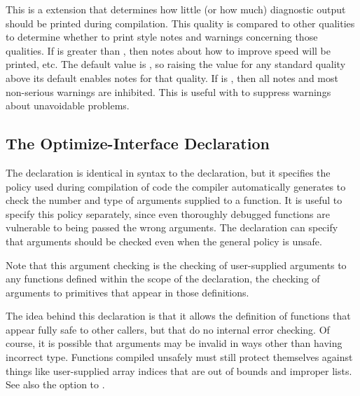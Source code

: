 \begin{Lentry}
\item[\code{extensions:inhibit-warnings}] This is a \cmucl{} extension that determines how
  little (or how much) diagnostic output should be printed during
  compilation.  This quality is compared to other qualities to
  determine whether to print style notes and warnings concerning those
  qualities.  If  is greater than ,
  then notes about how to improve speed will be printed, etc.  The
  default value is , so raising the value for any standard
  quality above its default enables notes for that quality.  If
   is , then all notes and most
  non-serious warnings are inhibited.  This is useful with
   to suppress warnings about unavoidable problems.
\end{Lentry}


\subsection{The Optimize-Interface Declaration}
\label{optimize-interface-declaration}

The  declaration is identical in
syntax to the  declaration, but it specifies the policy
used during compilation of code the compiler automatically generates
to check the number and type of arguments supplied to a function.  It
is useful to specify this policy separately, since even thoroughly
debugged functions are vulnerable to being passed the wrong arguments.
The  declaration can specify that arguments
should be checked even when the general  policy is
unsafe.

Note that this argument checking is the checking of user-supplied
arguments to any functions defined within the scope of the
declaration,  the checking of arguments to \llisp{}
primitives that appear in those definitions.

The idea behind this declaration is that it allows the definition of
functions that appear fully safe to other callers, but that do no
internal error checking.  Of course, it is possible that arguments may
be invalid in ways other than having incorrect type.  Functions
compiled unsafely must still protect themselves against things like
user-supplied array indices that are out of bounds and improper lists.
See also the  option to
.


